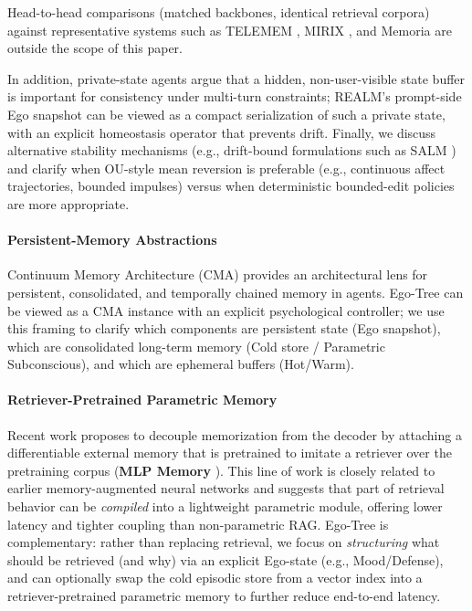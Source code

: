 \documentclass{article}
\begin{document}
Head-to-head comparisons (matched backbones, identical retrieval corpora) against representative systems such as TELEMEM \cite{telemem2025}, MIRIX \cite{mirix2025}, and Memoria \cite{memoria2025} are outside the scope of this paper.

In addition, private-state agents argue that a hidden, non-user-visible state buffer is important for consistency under multi-turn constraints; REALM's prompt-side Ego snapshot can be viewed as a compact serialization of such a private state, with an explicit homeostasis operator that prevents drift.
Finally, we discuss alternative stability mechanisms (e.g., drift-bound formulations such as SALM \cite{salm2024}) and clarify when OU-style mean reversion is preferable (e.g., continuous affect trajectories, bounded impulses) versus when deterministic bounded-edit policies are more appropriate.

\paragraph{Persistent-Memory Abstractions}
Continuum Memory Architecture (CMA) \cite{cma2024} provides an architectural lens for persistent, consolidated, and temporally chained memory in agents. Ego-Tree can be viewed as a CMA instance with an explicit psychological controller; we use this framing to clarify which components are persistent state (Ego snapshot), which are consolidated long-term memory (Cold store / Parametric Subconscious), and which are ephemeral buffers (Hot/Warm).

\paragraph{Retriever-Pretrained Parametric Memory}
Recent work proposes to decouple memorization from the decoder by attaching a differentiable external memory that is pretrained to imitate a retriever over the pretraining corpus (\textbf{MLP Memory} \cite{wei2025mlpmemory}). This line of work is closely related to earlier memory-augmented neural networks \cite{santoro2016mann} and suggests that part of retrieval behavior can be \textit{compiled} into a lightweight parametric module, offering lower latency and tighter coupling than non-parametric RAG. Ego-Tree is complementary: rather than replacing retrieval, we focus on \textit{structuring} what should be retrieved (and why) via an explicit Ego-state (e.g., Mood/Defense), and can optionally swap the cold episodic store from a vector index into a retriever-pretrained parametric memory to further reduce end-to-end latency.
\end{document}
